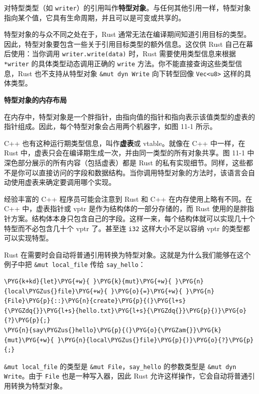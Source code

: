 对特型类型（如 \texttt{writer}）的引用叫作\textbf{特型对象}。与任何其他引用一样，特型对象指向某个值，它具有生命周期，并且可以是可变或共享的。

特型对象的与众不同之处在于，Rust 通常无法在编译期间知道引用目标的类型。因此，特型对象要包含一些关于引用目标类型的额外信息。这仅供 Rust 自己在幕后使用：当你调用 \texttt{writer.write(data)} 时，Rust 需要使用类型信息来根据 \texttt{*writer} 的具体类型动态调用正确的 \texttt{write} 方法。你不能直接查询这些类型信息，Rust 也不支持从特型对象 \texttt{\&mut dyn Write} 向下转型回像 \texttt{Vec<u8>} 这样的具体类型。

\textbf{特型对象的内存布局}

在内存中，特型对象是一个胖指针，由指向值的指针和指向表示该值类型的虚表的指针组成。因此，每个特型对象会占用两个机器字，如图 11-1 所示。

C++ 也有这种运行期类型信息，叫作\textbf{虚表}或 vtable。就像在 C++ 中一样，在 Rust 中，虚表只会在编译期生成一次，并由同一类型的所有对象共享。图 11-1 中深色部分展示的所有内容（包括虚表）都是 Rust 的私有实现细节。同样，这些都不是你可以直接访问的字段和数据结构。当你调用特型对象的方法时，该语言会自动使用虚表来确定要调用哪个实现。


经验丰富的 C++ 程序员可能会注意到 Rust 和 C++ 在内存使用上略有不同。在 C++ 中，虚表指针或 vptr 是作为结构体的一部分存储的，而 Rust 使用的是胖指针方案。结构体本身只包含自己的字段。这样一来，每个结构体就可以实现几十个特型而不必包含几十个 vptr 了。甚至连 \texttt{i32} 这样大小不足以容纳 vptr 的类型都可以实现特型。

Rust 在需要时会自动将普通引用转换为特型对象。这就是为什么我们能够在这个例子中把 \texttt{\&mut local\_file} 传给 \texttt{say\_hello}：

\begin{Verbatim}[commandchars=\\\{\},breaklines=true,breakanywhere=true,fontsize=\codefont,xleftmargin=17bp]
\PYG{k+kd}{let}\PYG{+w}{ }\PYG{k}{mut}\PYG{+w}{ }\PYG{n}{local\PYGZus{}file}\PYG{+w}{ }\PYG{o}{=}\PYG{+w}{ }\PYG{n}{File}\PYG{p}{::}\PYG{n}{create}\PYG{p}{(}\PYG{l+s}{\PYGZdq{}}\PYG{l+s}{hello.txt}\PYG{l+s}{\PYGZdq{}}\PYG{p}{)}\PYG{o}{?}\PYG{p}{;}
\PYG{n}{say\PYGZus{}hello}\PYG{p}{(}\PYG{o}{\PYGZam{}}\PYG{k}{mut}\PYG{+w}{ }\PYG{n}{local\PYGZus{}file}\PYG{p}{)}\PYG{o}{?}\PYG{p}{;}
\end{Verbatim}

\texttt{\&mut local\_file} 的类型是 \texttt{\&mut File}，\texttt{say\_hello} 的参数类型是 \texttt{\&mut dyn Write}。由于 \texttt{File} 也是一种写入器，因此 Rust 允许这样操作，它会自动将普通引用转换为特型对象。

